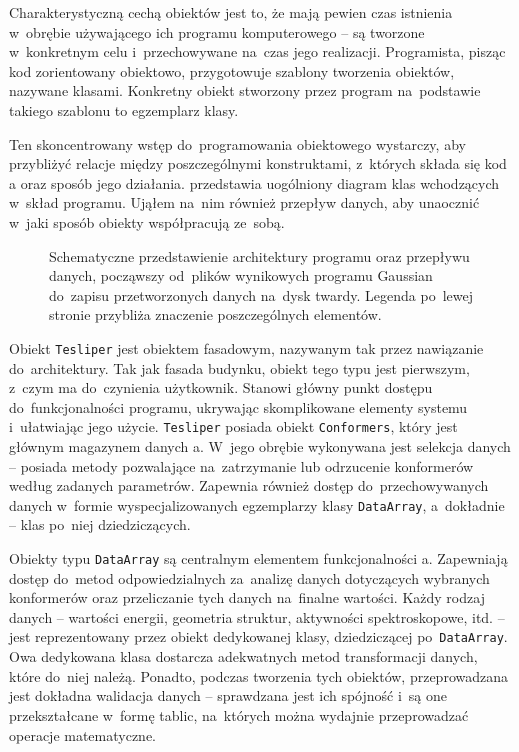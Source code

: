 Charakterystyczną cechą obiektów jest to, że mają pewien czas istnienia w~obrębie używającego ich
  programu komputerowego \--- są tworzone w~konkretnym celu i~przechowywane na~czas jego realizacji.
Programista, pisząc kod zorientowany obiektowo, przygotowuje szablony tworzenia obiektów,
  nazywane klasami.
Konkretny obiekt stworzony przez program na~podstawie takiego szablonu to egzemplarz klasy.

Ten skoncentrowany wstęp do~programowania obiektowego wystarczy, aby przybliżyć relacje między
  poszczególnymi konstruktami, z~których składa się kod \tesliper{}a oraz sposób jego działania.
 przedstawia uogólniony diagram klas wchodzących w~skład programu.
Ująłem na~nim również przepływ danych, aby unaocznić w~jaki sposób obiekty współpracują ze~sobą.

\begin{figure}
  
  \caption{
    Schematyczne przedstawienie architektury programu \tesliper{} oraz przepływu danych,
      począwszy od~plików wynikowych programu Gaussian do~zapisu przetworzonych danych
      na~dysk twardy.
    Legenda po~lewej stronie przybliża znaczenie poszczególnych elementów.
  }
  \label{fig:class-diagram}
\end{figure}

Obiekt \texttt{Tesliper} jest obiektem fasadowym, nazywanym tak przez nawiązanie do~architektury.
Tak jak fasada budynku, obiekt tego typu jest pierwszym, z~czym ma do~czynienia użytkownik.
Stanowi główny punkt dostępu do~funkcjonalności programu, ukrywając skomplikowane elementy
  systemu i~ułatwiając jego użycie.
\texttt{Tesliper} posiada obiekt \texttt{Conformers},
  który jest głównym magazynem danych \tesliper{}a.
W~jego obrębie wykonywana jest selekcja danych \--- posiada metody pozwalające
  na~zatrzymanie lub odrzucenie
  konformerów według zadanych parametrów.
Zapewnia również dostęp do~przechowywanych danych w~formie wyspecjalizowanych egzemplarzy
  klasy \texttt{DataArray}, a~dokładnie \--- klas po~niej dziedziczących.

Obiekty typu \texttt{DataArray} są centralnym elementem funkcjonalności \tesliper{}a.
Zapewniają dostęp do~metod odpowiedzialnych za~analizę danych dotyczących wybranych konformerów
  oraz przeliczanie tych danych na~finalne wartości.
Każdy rodzaj danych \--- wartości energii, geometria struktur, aktywności spektroskopowe, itd.
  \--- jest reprezentowany przez obiekt dedykowanej klasy, dziedziczącej po~\texttt{DataArray}.
Owa dedykowana klasa dostarcza adekwatnych metod transformacji danych, które do~niej należą.
Ponadto, podczas tworzenia tych obiektów, przeprowadzana jest dokładna walidacja danych \---
  sprawdzana jest ich spójność i~są one przekształcane w~formę tablic, na~których można
  wydajnie przeprowadzać operacje matematyczne.

